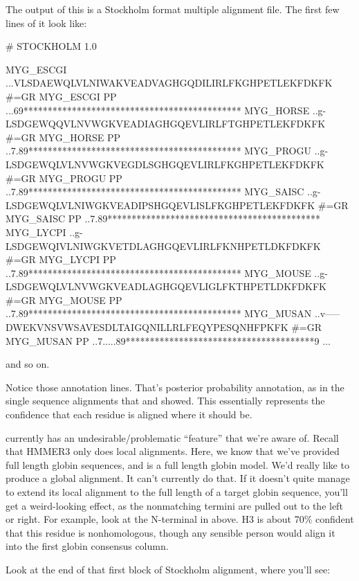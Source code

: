 The output of this is a Stockholm format multiple alignment file. The
first few lines of it look like:

\begin{sreoutput}
# STOCKHOLM 1.0

MYG_ESCGI          ...VLSDAEWQLVLNIWAKVEADVAGHGQDILIRLFKGHPETLEKFDKFK
#=GR MYG_ESCGI  PP ...69*********************************************
MYG_HORSE          ..g-LSDGEWQQVLNVWGKVEADIAGHGQEVLIRLFTGHPETLEKFDKFK
#=GR MYG_HORSE  PP ..7.89********************************************
MYG_PROGU          ..g-LSDGEWQLVLNVWGKVEGDLSGHGQEVLIRLFKGHPETLEKFDKFK
#=GR MYG_PROGU  PP ..7.89********************************************
MYG_SAISC          ..g-LSDGEWQLVLNIWGKVEADIPSHGQEVLISLFKGHPETLEKFDKFK
#=GR MYG_SAISC  PP ..7.89********************************************
MYG_LYCPI          ..g-LSDGEWQIVLNIWGKVETDLAGHGQEVLIRLFKNHPETLDKFDKFK
#=GR MYG_LYCPI  PP ..7.89********************************************
MYG_MOUSE          ..g-LSDGEWQLVLNVWGKVEADLAGHGQEVLIGLFKTHPETLDKFDKFK
#=GR MYG_MOUSE  PP ..7.89********************************************
MYG_MUSAN          ..v-----DWEKVNSVWSAVESDLTAIGQNILLRLFEQYPESQNHFPKFK
#=GR MYG_MUSAN  PP ..7.....89***************************************9
...
\end{sreoutput}

and so on. 

Notice those  annotation lines. That's posterior probability
annotation, as in the single sequence alignments that 
and  showed. This essentially represents the
confidence that each residue is aligned where it should be.

 currently has an undesirable/problematic ``feature''
that we're aware of. Recall that HMMER3 only does local
alignments. Here, we know that we've provided full length globin
sequences, and  is a full length globin model. We'd
really like  to produce a global alignment. It can't
currently do that. If it doesn't quite manage to extend its local
alignment to the full length of a target globin sequence, you'll get a
weird-looking effect, as the nonmatching termini are pulled out to the
left or right. For example, look at the N-terminal  in
 above. H3 is about 70\% confident that this residue
is nonhomologous, though any sensible person would align it into the
first globin consensus column.

Look at the end of that first block of Stockholm alignment, where you'll
see:

